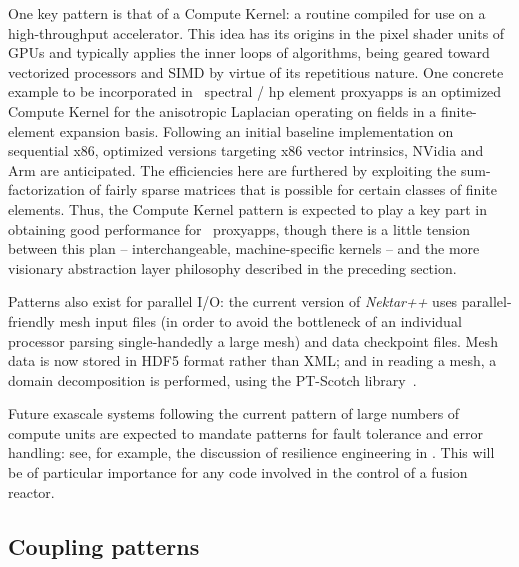 One key pattern is that of a Compute Kernel: a routine compiled for use on a
high-throughput accelerator.  
This idea has its origins in the pixel shader units of GPUs and typically
applies the inner loops of algorithms, being geared toward vectorized
processors and SIMD by virtue of its repetitious nature.  
One concrete example to be incorporated in \nep\ spectral / hp element
proxyapps is an optimized Compute Kernel for the anisotropic Laplacian
operating on fields in a finite-element expansion basis.  
Following an initial baseline implementation on sequential x86, optimized
versions targeting x86 vector intrinsics, NVidia and Arm are anticipated. 
The efficiencies here are furthered by exploiting the sum-factorization of
fairly sparse matrices that is possible for certain classes of finite
elements.  
Thus, the Compute Kernel pattern is expected to play a key part in obtaining
good performance for \nep\ proxyapps, though there is a little tension between
this plan -- interchangeable, machine-specific kernels -- and the more
visionary abstraction layer philosophy described in the preceding section.

Patterns also exist for parallel I/O: the current version of {\it Nektar++}
uses parallel-friendly mesh input files (in order to avoid the bottleneck of
an individual processor parsing single-handedly a large mesh) and data
checkpoint files. Mesh data is now stored in HDF5 format rather than XML; and
in reading a mesh, a domain decomposition is performed, using the PT-Scotch
library~\cite{Mo20Nekt, scotchwebsite}.

Future exascale systems following the current pattern of large numbers of
compute units are expected to mandate patterns for fault tolerance and error
handling: see, for example, the discussion of resilience engineering in
\cite{sommerville}.  This will be of particular importance for any code
involved in the control of a fusion reactor.

\subsection{Coupling patterns}

